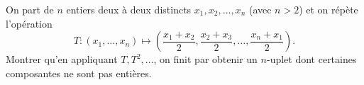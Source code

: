 On part de $n$ entiers deux à deux distincts $x_1, x_2, \ldots, x_n$ (avec $n > 2$) et on répète l'opération
\[ T : (x_1, \ldots, x_n) \mapsto \left(\frac{x_1 + x_2}{2}, \frac{x_2 + x_3}{2}, \ldots, \frac{x_n + x_1}{2}\right). \]
Montrer qu'en appliquant $T, T^2, \ldots$, on finit par obtenir un $n$-uplet dont certaines composantes ne sont pas entières.
